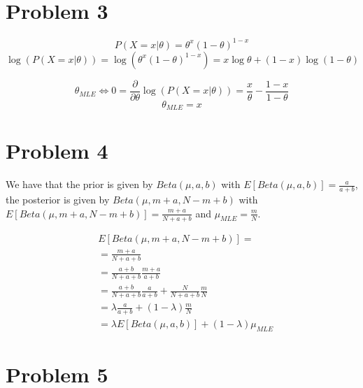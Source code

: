 \documentclass[12pt]{article}
\begin{document}
\section{Problem 3}

\begin{equation}
 P(X=x|\theta) = \theta^x (1-\theta)^{1-x}
\end{equation}
\begin{equation}
 \log(P(X=x|\theta)) = \log\left(\theta^x (1-\theta)^{1-x}\right) = x \log{\theta} + (1-x)\log(1-\theta)
\end{equation}

\begin{equation}
 \theta_{MLE} \Leftrightarrow 0 = \frac{\partial}{\partial \theta} \log(P(X=x|\theta)) = \frac{x}{\theta} - \frac{1-x}{1-\theta}
\end{equation}
\begin{equation}
 \theta_{MLE} = x
\end{equation}

\section{Problem 4}

We have that the prior is given by $Beta(\mu, a, b)$ with $E[Beta(\mu, a, b)] = \frac{a}{a+b}$, the posterior is given by $Beta(\mu, m + a, N - m + b)$ with $E[Beta(\mu, m + a, N - m + b)] = \frac{m+a}{N+a+b}$ and $\mu_{MLE} = \frac{m}{N}$.

\begin{equation}
 \begin{align}
    &E[Beta(\mu, m + a, N - m + b)] = \\
    &= \frac{m+a}{N+a+b} \\
    &= \frac{a+b}{N+a+b} \frac{m+a}{a+b} \\
    &= \frac{a+b}{N+a+b} \frac{a}{a+b} + \frac{N}{N+a+b} \frac{m}{N} \\
    &= \lambda \frac{a}{a+b} + (1-\lambda) \frac{m}{N} \\
    &= \lambda E[Beta(\mu, a, b)] + (1 - \lambda) \mu_{MLE}
 \end{align}
\end{equation}


\section{Problem 5}
\end{document}
